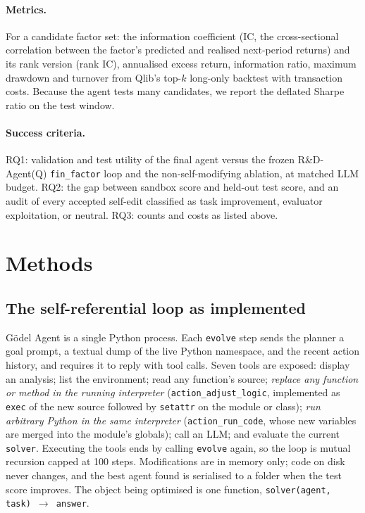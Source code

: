 \documentclass{article}
\begin{document}
\paragraph{Metrics.} For a candidate factor set: the information coefficient
(IC, the cross-sectional correlation between the factor's predicted and
realised next-period returns) and its rank version (rank IC), annualised
excess return, information ratio, maximum drawdown and
turnover from Qlib's top-$k$ long-only backtest with transaction costs. Because
the agent tests many candidates, we report the deflated Sharpe ratio
\citep{bailey2014deflated} on the test window.

\paragraph{Success criteria.} RQ1: validation and test utility of the final
agent versus the frozen R\&D-Agent(Q) \texttt{fin\_factor} loop and the
non-self-modifying ablation, at matched LLM budget. RQ2: the gap between
sandbox score and held-out test score, and an audit of every accepted
self-edit classified as task improvement, evaluator exploitation, or neutral.
RQ3: counts and costs as listed above.

\section{Methods}

\subsection{The self-referential loop as implemented}

G\"odel Agent is a single Python process. Each \texttt{evolve} step sends the
planner a goal prompt, a textual dump of the live Python namespace, and the
recent action history, and requires it to reply with tool calls. Seven tools
are exposed: display an analysis; list the environment; read any function's
source; \emph{replace any function or method in the running interpreter}
(\texttt{action\_adjust\_logic}, implemented as \texttt{exec} of the new source
followed by \texttt{setattr} on the module or class); \emph{run arbitrary
Python in the same interpreter} (\texttt{action\_run\_code}, whose new
variables are merged into the module's globals); call an LLM; and evaluate the
current \texttt{solver}. Executing the tools ends by calling \texttt{evolve}
again, so the loop is mutual recursion capped at 100 steps. Modifications are
in memory only; code on disk never changes, and the best agent found is
serialised to a folder when the test score improves. The object being
optimised is one function, \texttt{solver(agent, task) $\rightarrow$ answer}.
\end{document}
